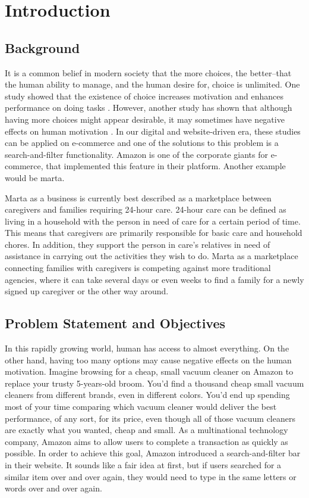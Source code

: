 \newpage
\chapter{Introduction}

\section{Background}

It is a common belief in modern society that the more choices, the better--that the human ability to manage, and the human desire for, choice is unlimited. One study showed that the existence of choice increases motivation and enhances performance on doing tasks \autocite{zuckerman1978importance}. However, another study has shown that although having more choices might appear desirable, it may sometimes have negative effects on human motivation \autocite{iyengar2000choice}. In our digital and website-driven era, these studies can be applied on e-commerce and one of the solutions to this problem is a search-and-filter functionality. Amazon is one of the corporate giants for e-commerce, that implemented this feature in their platform. Another example would be marta. 

Marta as a business is currently best described as a marketplace between caregivers and families requiring 24-hour care. 24-hour care can be defined as living in a household with the person in need of care for a certain period of time. This means that caregivers are primarily responsible for basic care and household chores. In addition, they support the person in care's relatives in need of assistance in carrying out the activities they wish to do. Marta as a marketplace connecting families with caregivers is competing against more traditional agencies, where it can take several days or even weeks to find a family for a newly signed up caregiver or the other way around.

\section{Problem Statement and Objectives}

In this rapidly growing world, human has access to almost everything. On the other hand, having too many options may cause negative effects on the human motivation. Imagine browsing for a cheap, small vacuum cleaner on Amazon to replace your trusty 5-years-old broom. You'd find a thousand cheap small vacuum cleaners from different brands, even in different colors. You'd end up spending most of your time comparing which vacuum cleaner would deliver the best performance, of any sort, for its price, even though all of those vacuum cleaners are exactly what you wanted, cheap and small. As a multinational technology company, Amazon aims to allow users to complete a transaction as quickly as possible. In order to achieve this goal, Amazon introduced a search-and-filter bar in their website. It sounds like a fair idea at first, but if users searched for a similar item over and over again, they would need to type in the same letters or words over and over again.

